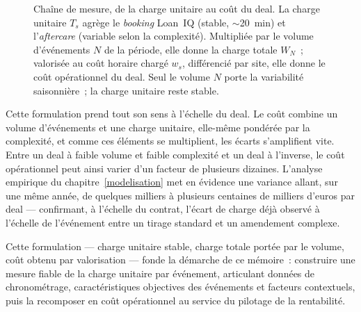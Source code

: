 \begin{figure}[H]
\caption{Chaîne de mesure, de la charge unitaire au coût du deal. La charge unitaire $T_{s}$ agrège le \textit{booking} Loan~IQ (stable, $\sim$20~min) et l'\textit{aftercare} (variable selon la complexité). Multipliée par le volume d'événements $N$ de la période, elle donne la charge totale $W_N$~; valorisée au coût horaire chargé $w_s$, différencié par site, elle donne le coût opérationnel du deal. Seul le volume $N$ porte la variabilité saisonnière~; la charge unitaire reste stable.}
\label{fig:chaine-mesure}
\end{figure}
\medskip

Cette formulation prend tout son sens à l'échelle du deal. Le coût combine un volume d'événements et une charge unitaire, elle-même pondérée par la complexité, et comme ces éléments se multiplient, les écarts s'amplifient vite. Entre un deal à faible volume et faible complexité et un deal à l'inverse, le coût opérationnel peut ainsi varier d'un facteur de plusieurs dizaines. L'analyse empirique du chapitre~\ref{modelisation} met en évidence une variance allant, sur une même année, de quelques milliers à plusieurs centaines de milliers d'euros par deal --- confirmant, à l'échelle du contrat, l'écart de charge déjà observé à l'échelle de l'événement entre un tirage standard et un amendement complexe.

Cette formulation --- charge unitaire stable, charge totale portée par le volume, coût obtenu par valorisation --- fonde la démarche de ce mémoire~: construire une mesure fiable de la charge unitaire par événement, articulant données de chronométrage, caractéristiques objectives des événements et facteurs contextuels, puis la recomposer en coût opérationnel au service du pilotage de la rentabilité.

